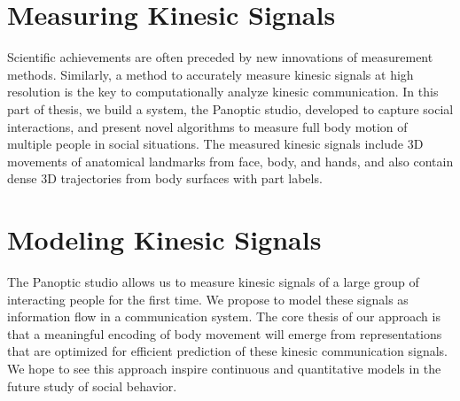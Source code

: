 \documentclass[oneside,letterpaper]{memoir}
\makeatletter
\renewcommand\listoffigures{%
	\@starttoc{lot}%
}
\renewcommand\listoftables{%
	\@starttoc{lot}%
}
\makeatother
\begin{document}

\newpage
{}
\tableofcontents
{}

\mainmatter




\part{Measuring Kinesic Signals}

Scientific achievements are often preceded by new innovations of measurement methods. Similarly, a method to accurately measure kinesic signals at high resolution is the key to computationally analyze kinesic communication. In this part of thesis, we build a system, the Panoptic studio, developed to capture social interactions, and present novel algorithms to measure full body motion of multiple people in social situations. The measured kinesic signals include 3D movements of anatomical landmarks from face, body, and hands, and also contain dense 3D trajectories from body surfaces with part labels. 
\pagebreak







\part{Modeling Kinesic Signals}

The Panoptic studio allows us to measure kinesic signals of a large group of interacting people for the first time. We propose to model these signals as information flow in a communication system. The core thesis of our approach is that a meaningful encoding of body movement will emerge from representations that are optimized for efficient prediction of these kinesic communication signals. We hope to see this approach inspire continuous and quantitative models in the future study of social behavior. 
\end{document}
